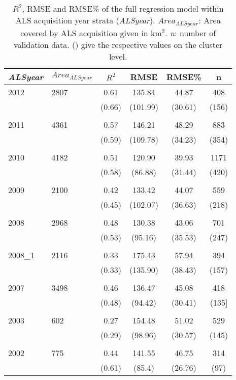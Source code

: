 \begin{table}[ht]
	\begin{center}
		\caption{$R^2$, RMSE and RMSE\% of the full regression model within ALS acquisition year strata (\textit{ALSyear}). $Area_{ALSyear}$: Area covered by ALS acquisition given in km$^2$. \textit{n}: number of validation data. () give the respective values on the cluster level.}
		\label{tab:adj_r2_within}
		{\small %
			\begin{tabular}{llcccc}
				\hline
				\textit{ALSyear} & $Area_{ALSyear}$ & $R^2$ & RMSE & RMSE\% & n \\ 
				\hline
				2012  & 2807  &  0.61  &  135.84  &  44.87  &  408  \\ 
				&&             (0.66) & (101.99) & (30.61) & (156) \\ 
				\\
				2011  & 4361  &  0.57   & 146.21   &  48.29  & 883  \\ 
				&&             (0.59)  & (109.78) & (34.23) & (354) \\
				\\
				2010 & 4182     & 0.51  & 120.90   & 39.93  & 1171 \\ 
				&&             (0.58)  & (86.88) & (31.44) & (420) \\
				\\       
				2009 & 2100     & 0.42  & 133.42  & 44.07  & 559  \\   
				&&             (0.45)  & (102.07) & (36.63) & (218) \\
				\\               
				2008 & 2968     & 0.48  & 130.38   & 43.06  & 701  \\        
				&&             (0.53)  & (95.16) & (35.53) & (247) \\
				\\                       
				2008\_1 & 2116  & 0.33  & 175.43  & 57.94  & 394  \\      
				&&             (0.33)  & (135.90) & (38.43) & (157) \\
				\\             
				2007 & 3498     & 0.46  & 136.47   & 45.08   & 418  \\ 
				&&             (0.48)  & (94.42)  & (30.41) & (135] \\
				\\  
				2003 & 602      & 0.27  & 154.48   & 51.02  & 529  \\ 
				&&             (0.29)  & (98.96) & (30.57) & (145) \\
				\\ 
				2002 & 775      & 0.44  & 141.55   & 46.75   & 314   \\ 
				&&             (0.61) & (85.4) & (26.76) & (97) \\
				\hline
				\hline
			\end{tabular}
		}%
	\end{center}
\end{table}